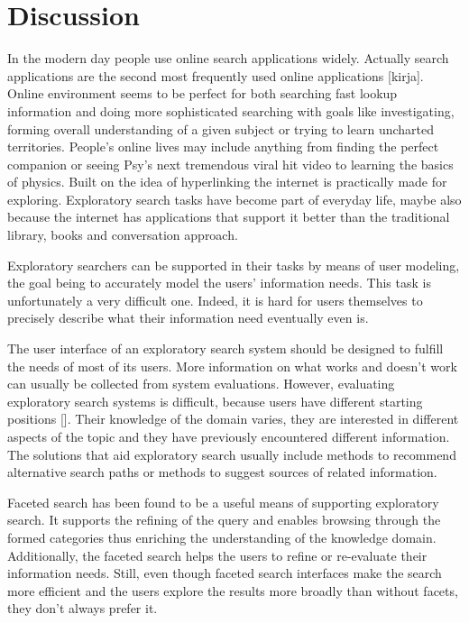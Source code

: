 \section{Discussion}

In the modern day people use online search applications widely. Actually search applications are the second most frequently used online applications [kirja]. Online environment seems to be perfect for both searching  fast lookup information and doing more sophisticated searching with goals like investigating, forming overall understanding of a given subject or trying to learn uncharted territories. People's online lives may include anything from finding the perfect companion or seeing Psy's next tremendous viral hit video to learning the basics of physics.  Built on the idea of hyperlinking the internet is practically made for exploring. Exploratory search tasks have become part of everyday life, maybe also because the internet has applications that support it better than the traditional library, books and conversation approach.

Exploratory searchers can be supported in their tasks by means of user modeling, the goal being to accurately model the users' information needs. This task is unfortunately a very difficult one. Indeed, it is hard for users themselves to precisely describe what their information need eventually even is. 

The user interface of an exploratory search system should be designed to fulfill the needs of most of its users. 
More information on what works and doesn't work can usually be collected from system evaluations.
However, evaluating exploratory search systems is difficult, because users have different starting positions [].
Their knowledge of the domain varies, they are interested in different aspects of the topic and they have previously encountered different information.
The solutions that aid exploratory search usually include methods to recommend alternative search paths or methods to suggest sources of related information. 

Faceted search has been found to be a useful means of supporting exploratory search. It supports the refining of the query and enables browsing through the formed categories thus enriching the understanding of the knowledge domain. Additionally, the faceted search helps the users to refine or re-evaluate their information needs. Still, even though faceted search interfaces make the search more efficient and the users explore the results more broadly than without facets, they don't always prefer it. 

